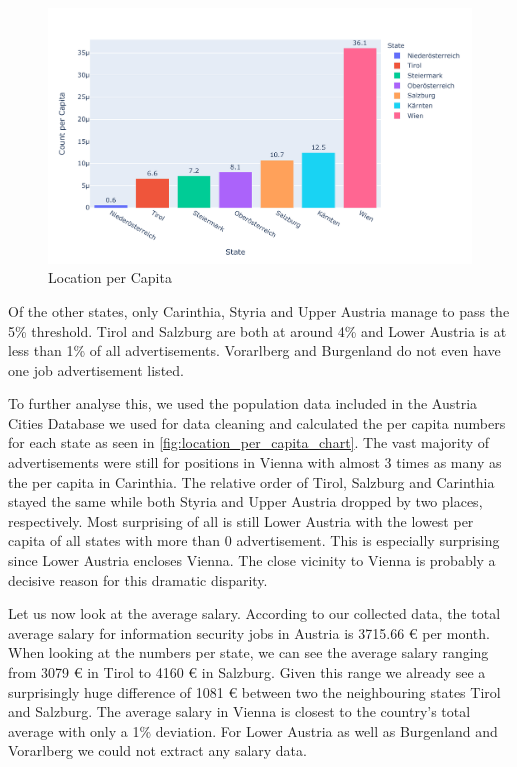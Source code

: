 \documentclass[runningheads]{llncs}
\begin{document}
\begin{figure}[H]
	\centering
  \includegraphics[width=\textwidth]{location-per-capita-bar-chart.pdf}
	\caption{Location per Capita}
	\label{fig:location_per_capita_chart}
\end{figure}

Of the other states, only Carinthia, Styria and Upper Austria manage to pass the 5\% threshold. Tirol and Salzburg are both at around 4\% and Lower Austria is at less than 1\% of all advertisements. Vorarlberg and Burgenland do not even have one job advertisement listed.

To further analyse this, we used the population data included in the Austria Cities Database \cite{austria_cities_database} we used for data cleaning and calculated the per capita numbers for each state as seen in \autoref{fig:location_per_capita_chart}. The vast majority of advertisements were still for positions in Vienna with almost 3 times as many as the per capita in Carinthia. The relative order of Tirol, Salzburg and Carinthia stayed the same while both Styria and Upper Austria dropped by two places, respectively. Most surprising of all is still Lower Austria with the lowest per capita of all states with more than 0 advertisement. This is especially surprising since Lower Austria encloses Vienna. The close vicinity to Vienna is probably a decisive reason for this dramatic disparity.

Let us now look at the average salary. According to our collected data, the total average salary for information security jobs in Austria is 3715.66 € per month. When looking at the numbers per state, we can see the average salary ranging from 3079 € in Tirol to 4160 € in Salzburg. Given this range we already see a surprisingly huge difference of 1081 € between two the neighbouring states Tirol and Salzburg. The average salary in Vienna is closest to the country's total average with only a 1\% deviation. For Lower Austria as well as Burgenland and Vorarlberg we could not extract any salary data.
\end{document}
